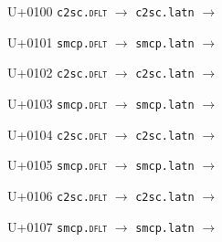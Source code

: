 \documentclass{article}
\begin{document}
\begin{substitutions}

U+0100  \linebreak
    \texttt{c2sc.\textsc{dflt}} $\to$  \linebreak
    \texttt{c2sc.latn} $\to$  

\goodbreak

U+0101  \linebreak
    \texttt{smcp.\textsc{dflt}} $\to$  \linebreak
    \texttt{smcp.latn} $\to$  

\goodbreak

U+0102  \linebreak
    \texttt{c2sc.\textsc{dflt}} $\to$  \linebreak
    \texttt{c2sc.latn} $\to$  

\goodbreak

U+0103  \linebreak
    \texttt{smcp.\textsc{dflt}} $\to$  \linebreak
    \texttt{smcp.latn} $\to$  

\goodbreak

U+0104  \linebreak
    \texttt{c2sc.\textsc{dflt}} $\to$  \linebreak
    \texttt{c2sc.latn} $\to$  

\goodbreak

U+0105  \linebreak
    \texttt{smcp.\textsc{dflt}} $\to$  \linebreak
    \texttt{smcp.latn} $\to$  

\goodbreak

U+0106  \linebreak
    \texttt{c2sc.\textsc{dflt}} $\to$  \linebreak
    \texttt{c2sc.latn} $\to$  

\goodbreak

U+0107  \linebreak
    \texttt{smcp.\textsc{dflt}} $\to$  \linebreak
    \texttt{smcp.latn} $\to$  

\goodbreak


\end{substitutions}
\end{document}
